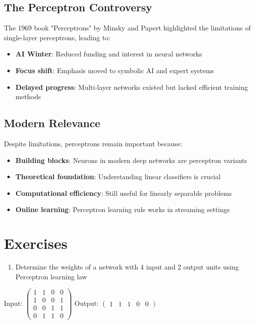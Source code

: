 \subsection{The Perceptron Controversy}
The 1969 book "Perceptrons" by Minsky and Papert highlighted the limitations of single-layer perceptrons, leading to:
\begin{itemize}
    \item \textbf{AI Winter}: Reduced funding and interest in neural networks
    \item \textbf{Focus shift}: Emphasis moved to symbolic AI and expert systems
    \item \textbf{Delayed progress}: Multi-layer networks existed but lacked efficient training methods
\end{itemize}

\subsection{Modern Relevance}
Despite limitations, perceptrons remain important because:
\begin{itemize}
    \item \textbf{Building blocks}: Neurons in modern deep networks are perceptron variants
    \item \textbf{Theoretical foundation}: Understanding linear classifiers is crucial
    \item \textbf{Computational efficiency}: Still useful for linearly separable problems
    \item \textbf{Online learning}: Perceptron learning rule works in streaming settings
\end{itemize}

\section{Exercises} 
 
\begin{enumerate}
    \item Determine the weights of a network with 4 input and 2 output units using Perceptron learning law
\end{enumerate}
Input:
\(\begin{pmatrix} 1 & 1 & 0 & 0 \\ 1 & 0 & 0 & 1 \\ 0 & 0 & 1 & 1 \\ 0 & 1 & 1 & 0 \end{pmatrix}\)
Output:
\( \begin{pmatrix} 1& 1 & 1 & 0 & 0 \end{pmatrix} \)

